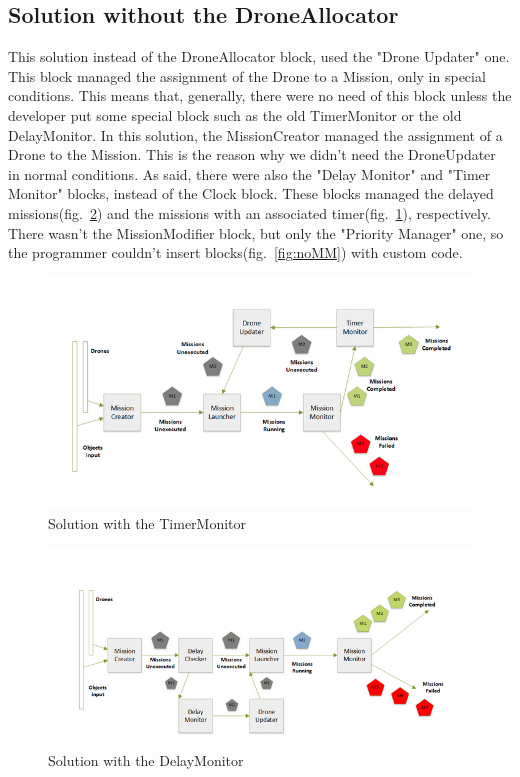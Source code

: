 \subsection{Solution without the DroneAllocator}


This solution instead of the DroneAllocator block, used the "Drone Updater" one. This block managed the assignment of the Drone to a Mission, only in special conditions. This means that, generally, there were no need of this block unless the developer put some special block such as the old TimerMonitor or the old DelayMonitor.
In this solution, the MissionCreator managed the assignment of a Drone to the Mission. This is the reason why we didn't need the DroneUpdater in normal conditions.
As said, there were also the "Delay Monitor" and "Timer Monitor" blocks, instead of the Clock block.
These blocks managed the delayed missions(fig.~\ref{fig:delayMonitor}) and the missions with an associated timer(fig.~\ref{fig:noClock}), respectively.
There wasn't the MissionModifier block, but only the "Priority Manager" one, so the programmer couldn't insert blocks(fig.~\ref{fig:noMM}) with custom code.

\begin{figure}[H]
  \centering
  \includegraphics[width=\linewidth]{pictures/NoClock.png}
  \caption{Solution with the TimerMonitor}
  \label{fig:noClock}
\end{figure}


\begin{figure}[H]
  \centering
  \includegraphics[width=\linewidth]{pictures/DelayMonitor.png}
  \caption{Solution with the DelayMonitor}
  \label{fig:delayMonitor}
\end{figure}

